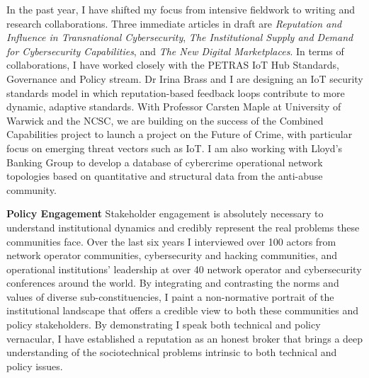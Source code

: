 \documentclass[11pt]{letter}
\begin{document}
\begin{letter}
In the past year, I have shifted my focus from intensive fieldwork to
writing and research collaborations. 
%
Three immediate articles in draft are \emph{Reputation and Influence
  in Transnational Cybersecurity}, \emph{The Institutional Supply and
  Demand for Cybersecurity Capabilities}, and \emph{The New Digital
  Marketplaces}. 
%
In terms of collaborations, I have worked closely with the PETRAS IoT
Hub Standards, Governance and Policy stream. 
%
Dr Irina Brass and I are designing an IoT security standards model in
which reputation-based feedback loops contribute to more dynamic,
adaptive standards. 
%
With Professor Carsten Maple at University of Warwick and the NCSC, we
are building on the success of the Combined Capabilities 
project to launch a project on the Future of Crime, with particular
focus on emerging threat vectors such as IoT. 
%
I am also working with Lloyd's Banking Group to develop a database of
cybercrime operational network topologies based on quantitative and
structural data from the anti-abuse community.
%

\textbf{Policy Engagement} \vspace{0.2 \baselineskip} \newline  
Stakeholder engagement is absolutely necessary to understand
institutional dynamics and credibly represent the real problems these
communities face. 
%
Over the last six years I interviewed over 100 actors from network
operator communities, cybersecurity and hacking communities, and
operational institutions' leadership at over 40 network operator and
cybersecurity conferences around the world. 
%
By integrating and contrasting the norms and values of diverse
sub-constituencies, I paint a non-normative portrait of the
institutional landscape  
that offers a credible view to both these communities and policy stakeholders. 
%
By demonstrating I speak both technical and policy vernacular, I have
established a reputation as an honest broker that brings a deep
understanding of the sociotechnical problems intrinsic to both
technical and policy issues.



\end{letter}
\end{document}
